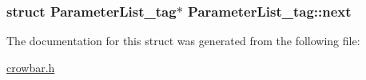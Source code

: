 \subsubsection[{next}]{\setlength{\rightskip}{0pt plus 5cm}struct {\bf Parameter\+List\+\_\+tag}$\ast$ Parameter\+List\+\_\+tag\+::next}\label{struct_parameter_list__tag_a9449cbcacc0fab949f133107943d75d7}


The documentation for this struct was generated from the following file\+:\begin{DoxyCompactItemize}
\item 
\hyperlink{crowbar_8h}{crowbar.\+h}\end{DoxyCompactItemize}
